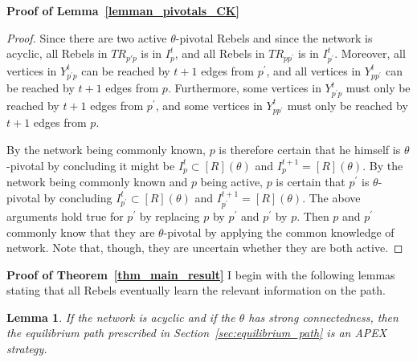 \documentclass[12pt,letter]{article}
\newtheorem{lemma}{Lemma}[section]
\newtheorem*{lemma*}{Lemma}
\theoremstyle{definition}
\theoremstyle{remark}
\theoremstyle{claim}
\begin{document}
\bigskip
\noindent\textbf{Proof of Lemma~\ref{lemman_pivotals_CK}}
\begin{proof}
Since there are two active $\theta$-pivotal Rebels and since the network is acyclic, all Rebels in $TR_{p{'}p}$ is in $I^t_{p}$, and all Rebels in $TR_{pp^{'}}$ is in $I^t_{p^{'}}$. Moreover, all vertices in $Y^t_{p^{'}p}$ can be reached by $t+1$ edges from $p^{'}$, and all vertices in $Y^t_{pp^{'}}$ can be reached by $t+1$ edges from $p$. Furthermore, some vertices in $Y^t_{p^{'}p}$ must only be reached by $t+1$ edges from $p^{'}$, and some vertices in $Y^t_{pp^{'}}$ must only be reached by $t+1$ edges from $p$. 

By the network being commonly known, $p$ is therefore certain that he himself is $\theta$-pivotal by concluding it might be $I^t_{p}\subset [R](\theta)$ and $I^{t+1}_{p}=[R](\theta)$. By the network being commonly known and $p$ being active, $p$ is certain that $p^{'}$ is $\theta$-pivotal by concluding $I^t_{p^{'}}\subset [R](\theta)$ and $I^{t+1}_{p^{'}}=[R](\theta)$. The above arguments hold true for $p^{'}$ by replacing $p$ by $p^{'}$ and $p^{'}$ by $p$. Then $p$ and $p^{'}$ commonly know that they are $\theta$-pivotal by applying the common knowledge of network. Note that, though, they are uncertain whether they are both active.
\end{proof}
\bigskip
\noindent\textbf{Proof of Theorem~\ref{thm_main_result}}
I begin with the following lemmas stating that all Rebels eventually learn the relevant information on the path.
\begin{lemma}
\label{lemma:learning_on_the_path}
If the network is acyclic and if the $\theta$ has strong connectedness, then the equilibrium path prescribed in Section~\ref{sec:equilibrium_path} is an APEX strategy.
\end{lemma}
\end{document}
